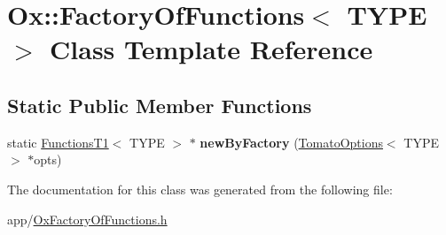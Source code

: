 \hypertarget{class_ox_1_1_factory_of_functions}{\section{Ox\-:\-:Factory\-Of\-Functions$<$ T\-Y\-P\-E $>$ Class Template Reference}
\label{class_ox_1_1_factory_of_functions}
}
\subsection*{Static Public Member Functions}
\begin{DoxyCompactItemize}
\item 
\hypertarget{class_ox_1_1_factory_of_functions_a188a9a0d61fcbca185c90e548be71bf0}{static \hyperlink{class_ox_1_1_functions_t1}{Functions\-T1}$<$ T\-Y\-P\-E $>$ $\ast$ {\bfseries new\-By\-Factory} (\hyperlink{struct_ox_1_1_tomato_options}{Tomato\-Options}$<$ T\-Y\-P\-E $>$ $\ast$opts)}\label{class_ox_1_1_factory_of_functions_a188a9a0d61fcbca185c90e548be71bf0}

\end{DoxyCompactItemize}


The documentation for this class was generated from the following file\-:\begin{DoxyCompactItemize}
\item 
app/\hyperlink{_ox_factory_of_functions_8h}{Ox\-Factory\-Of\-Functions.\-h}\end{DoxyCompactItemize}
